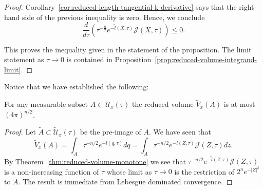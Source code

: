 \begin{proof}
Corollary~\ref{cor:reduced-length-tangential-k-derivative} says that the right-hand side of the
previous inequality is zero. Hence, we conclude
\begin{equation}\label{Jineq}
\frac{d}{d\tau}\left(\tau^{-\frac{n}{2}}e^{-\tilde
l(X,\tau)}{\mathcal J}(X,\tau)\right)\le 0. \end{equation}

This proves the inequality given in the statement of the
proposition. The limit statement as $\tau\rightarrow 0$ is contained
in Proposition~\ref{prop:reduced-volume-integrand-limit}.
\end{proof}

Notice that we have established the following:


\begin{corollary}\label{cor:reduced-volume-bounded}
\label{finiteredvol}
For any measurable subset $A\subset {\mathcal U}_x(\tau)$ the
reduced volume  $\widetilde V_x(A)$ is at most $(4\pi)^{n/2}$.
\end{corollary}


\begin{proof}
\sketch
Let $\widetilde A\subset \widetilde {\mathcal U}_x(\tau)$ be the pre-image
of $A$. We have seen that
$$\widetilde V_x(A)=\int_{A}\tau^{-n/2}e^{-l(q,\tau)}dq=\int_{\widetilde
A}\tau^{-n/2}e^{-\tilde l(Z,\tau)}{\mathcal J}(Z,\tau)dz.$$ By
Theorem~\ref{thm:reduced-volume-monotone} we see that $\tau^{-n/2}e^{-\tilde
l(Z,\tau)}{\mathcal J}(Z,\tau)$ is a non-increasing function of
$\tau$ whose limit as $\tau\rightarrow 0$ is the restriction of
$2^ne^{-|Z|^2}$ to $\widetilde A$. The result is immediate from
Lebesgue dominated convergence.
\end{proof}
